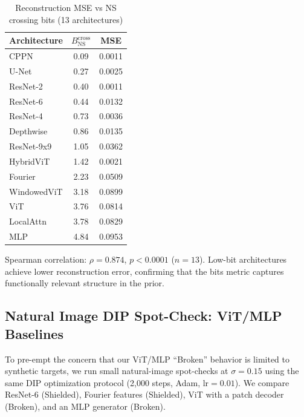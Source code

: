 \begin{table}[H]
\centering
\caption{Reconstruction MSE vs NS crossing bits (13 architectures)}
\label{tab:reconstruction_validation}
\begin{tabular}{lcc}
\toprule
Architecture & $B_{\text{NS}}^{\text{cross}}$ & MSE \\
\midrule
CPPN & 0.09 & 0.0011 \\
U-Net & 0.27 & 0.0025 \\
ResNet-2 & 0.40 & 0.0011 \\
ResNet-6 & 0.44 & 0.0132 \\
ResNet-4 & 0.73 & 0.0036 \\
Depthwise & 0.86 & 0.0135 \\
ResNet-9x9 & 1.05 & 0.0362 \\
HybridViT & 1.42 & 0.0021 \\
Fourier & 2.23 & 0.0509 \\
WindowedViT & 3.18 & 0.0899 \\
ViT & 3.76 & 0.0814 \\
LocalAttn & 3.78 & 0.0829 \\
MLP & 4.84 & 0.0953 \\
\bottomrule
\end{tabular}
\end{table}

Spearman correlation: $\rho = 0.874$, $p < 0.0001$ ($n = 13$). Low-bit architectures achieve lower reconstruction error, confirming that the bits metric captures functionally relevant structure in the prior.

\subsection{Natural Image DIP Spot-Check: ViT/MLP Baselines}
\label{app:dip_spotcheck_natural}

To pre-empt the concern that our ViT/MLP ``Broken'' behavior is limited to synthetic targets, we run small natural-image spot-checks at $\sigma=0.15$ using the same DIP optimization protocol (2,000 steps, Adam, $\text{lr}=0.01$). We compare ResNet-6 (Shielded), Fourier features (Shielded), ViT with a patch decoder (Broken), and an MLP generator (Broken).

